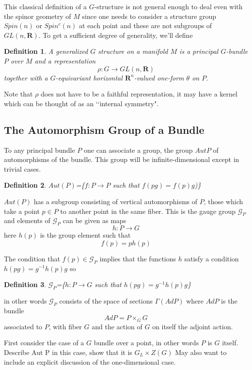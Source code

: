 \documentclass[a4paper,a4paper]{article}
\newtheorem{define}{Definition}
\theoremstyle{conjecture}
\begin{document}
This classical definition of a $G$-structure is not general enough to deal even with the spinor geometry
of $M$ since one needs to consider a structure group $Spin(n)$ or $Spin^c(n)$ at each point and
these are not subgroups of $GL(n,{\mathbf R})$. To get
a sufficient degree of generality, we'll define

\begin{define}
A generalized $G$ structure on a manifold $M$ is a principal $G$-bundle $P$ over $M$ and a
representation 
$$\rho:G\rightarrow GL(n,\mathbf R)$$
 together with a
$G$-equivariant horizontal ${\mathbf R}^n$-valued one-form $\theta$ on $P$.
\end{define}

Note that $\rho$ does not have to be a faithful representation, it may have a kernel which can
be thought of as an \lq\lq internal symmetry".

\subsection{The Automorphism Group of a Bundle}

To any principal bundle $P$ one can associate a group, the group $Aut P$ of automorphisms of the bundle.
This group will be infinite-dimensional except in trivial cases.

\begin{define}
$Aut (P)$=\{$f:P\rightarrow P$ such that $f(pg)=f(p)g$)\}
\end{define}

$Aut (P)$ has a subgroup consisting of vertical automorphisms of $P$, those which take a point $p\in P$ to another point
in the same fiber. This is the gauge group ${\mathcal G}_P$ and elements of ${\mathcal G}_P$ can be given as maps
$$h: P\rightarrow G$$
here $h(p)$ is the group element such that
$$f(p)=ph(p)$$

The condition that $f(p)\in {\mathcal G}_P$ implies that the functions $h$
satisfy a condition $h(pg)=g^{-1}h(p)g$ so
\begin{define}
${\mathcal G}_P$=\{$h:P\rightarrow G$ such that $h(pg)=g^{-1}h(p)g$\}
\end{define}
in other words ${\mathcal G}_P$ consists of the space of sections $\Gamma (Ad P)$ where $Ad P$ is the bundle
$$Ad P=P\times_G G$$
associated to $P$, with fiber $G$ and the action of $G$ on itself the adjoint action.


First consider the case of a $G$ bundle over a point, in other words $P$ is $G$ itself.  Describe Aut P in this case, show that it is $G_L\times Z(G)$
May also want to include an explicit discussion of the one-dimensional case.
\end{document}
